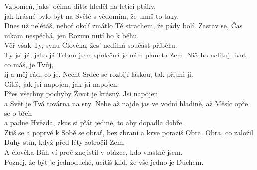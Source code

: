 \ve
{}Vzpomeň, jaks' očima dítte hleděl na letící ptáky,\\
jak krásné bylo být na Světě s vědomím, že umíš to taky.\\
Dnes už nelétáš, neboť okolí zmátlo Tě strachem, že pády bolí.
\ve
Zastav se, Čas nikam nespěchá, jen Rozum nutí ho k běhu.\\
Věř však Ty, synu Člověka, žes' nedílná součást příběhu.\\
Ty jsi já, jako já Tebou jsem,společná je nám planeta Zem.
Ničeho nelituj, ivot, co máš, je Tvůj,\\
ij a měj rád, co je.
Nechť Srdce se rozbijí láskou, tak přijmi ji.\\
Cítíš, jak jsi napojen, jak jsi napojen.\\ 
Přes všechny pochyby Život je krásný. Jsi napojen\\
a Svět je Tvá továrna na sny.
\ve
Nebe až najde jas ve vodní hladině, až Měsíc opře se o břeh\\
a padne Hvězda, zkus si přát jediné, to aby dopadla dobře.\\
Ztiš se a poprvé k Sobě se obrať, bez zbraní a krve porazíš Obra.
\ve
Obra, co založil Duhy stín, když před léty zotročil Zem.\\
A člověka Bůh ví proč znejistil v otázce, kdo vlastně jsem.\\
Poznej, že být je jednoduché, ucítíš klid, že vše jedno je Duchem.


\esong

